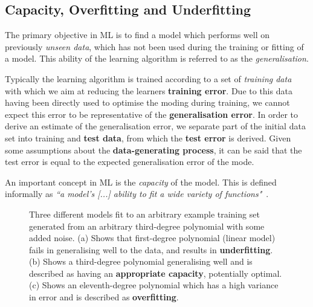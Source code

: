 \subsection{Capacity, Overfitting and Underfitting}
The primary objective in \gls{ML} is to find a model which performs well on
previously \textit{unseen data}, which has not been used during the training or
fitting of a model. This ability of the learning algorithm is referred to as the
\textit{generalisation}.

Typically the learning algorithm is trained according to a set of
\textit{training data} with which we aim at reducing the learners
\textbf{training error}. Due to this data having been directly used to optimise
the moding during training, we cannot expect this error to be representative of
the \textbf{generalisation error}. In order to derive an estimate of the
generalisation error, we separate part of the initial data set into training and
\textbf{test data}, from which the \textbf{test error} is derived. Given some
assumptions about the \textbf{data-generating process}, it can be said that the
test error is equal to the expected generalisation error of the mode.

An important concept in \gls{ML} is the \textit{capacity} of the model. This is
defined informally as \textit{``a model’s [...] ability to fit a wide
variety of functions"}~\cite[p.~111-112]{Goodfellow-et-al-2016}.

\begin{figure}[htp]
    \centering
    
    \captionsetup{format=hang} %
    \caption{
        Three different models fit to an arbitrary example training set
        generated from an arbitrary third-degree polynomial with some added
        noise. (a) Shows that first-degree polynomial (linear model) fails in
        generalising well to the data, and results in \textbf{underfitting}. (b)
        Shows a third-degree polynomial generalising well and is described as
        having an \textbf{appropriate capacity}, potentially optimal. (c) Shows
        an eleventh-degree polynomial which has a high variance in error and is
        described as \textbf{overfitting}.
    }
    \label{fig:mlp}
\end{figure}

